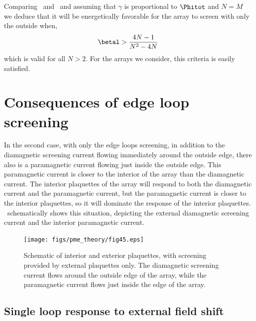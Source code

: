 Comparing \ and 
\ and assuming that $\gamma$ is 
proportional to $\Phitot$ and $N=M$
we deduce that it will be energetically
favorable for the array to screen with only the outside when,
%
\begin{equation}
\betal > {4 N -1 \over N^2 - 4N}
\end{equation}
%
which is valid for all $N>2$. For the arrays we consider, this 
criteria is easily satisfied. 

\section{Consequences of edge loop screening}

In the second case, with only the edge loops screening, 
in addition to the diamagnetic screening current flowing immediately
around the outside edge, there also is a paramagnetic
current flowing just inside the outside edge. This paramagnetic
current is closer to the interior of the array than the diamagnetic
current. The interior plaquettes of the array will respond to both
the diamagnetic current and the paramagnetic current, but the 
paramagnetic current is closer to the interior plaquettes, so 
it will dominate the response of the interior plaquettes. 
\  schematically shows this situation, 
depicting the external diamagnetic screening current and the interior
paramagnetic current.

\begin{figure}
\texttt{[image: figs/pme\_theory/fig45.eps]}
\caption[Schematic of interior and exterior plaquettes, with screening
provided by external plaquettes only]
{Schematic of interior and exterior plaquettes, with screening provided
by external plaquettes only. The diamagnetic screening current flows 
around the outside edge of the array, while the paramagnetic current
flows just inside the edge of the array.}
\label{fig:screening_schematic}
\end{figure}

\subsection{Single loop response to external field shift}

